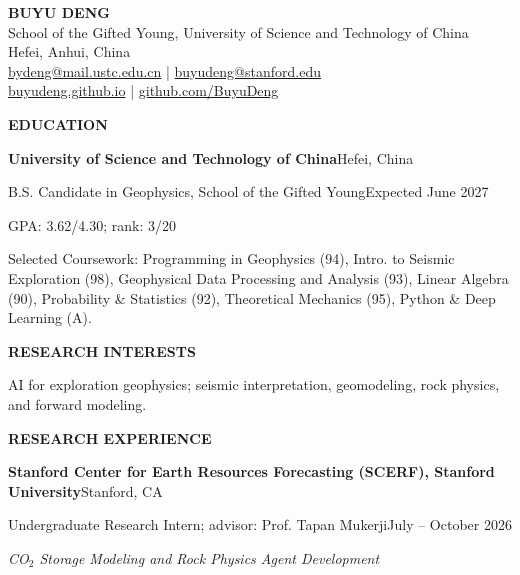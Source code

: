 \documentclass[10pt,letterpaper]{article}
\newcommand{\cvsection}[1]{\vspace{0.85em}\begin{center}\bfseries\MakeUppercase{#1}\end{center}\vspace{-0.7em}}
\newcommand{\cvorg}[2]{\textbf{#1}\hfill #2\par}
\newcommand{\cvrole}[2]{#1\hfill #2\par}
\newcommand{\cvproject}[1]{\par\vspace{0.42em}\textit{#1}\par}
\newcommand{\cvcontact}[3]{\href{#1}{#2\enspace #3}}
\begin{document}
\begin{center}
  {\large\bfseries BUYU DENG}\\[2pt]
  School of the Gifted Young, University of Science and Technology of China\\
  Hefei, Anhui, China\\
  \cvcontact{mailto:bydeng@mail.ustc.edu.cn}{\faEnvelope}{bydeng@mail.ustc.edu.cn}
  \quad | \quad
  \cvcontact{mailto:buyudeng@stanford.edu}{\faEnvelope}{buyudeng@stanford.edu}\\
  \cvcontact{https://buyudeng.github.io/}{\faGlobe}{buyudeng.github.io}
  \quad | \quad
  \cvcontact{https://github.com/BuyuDeng}{\faGithub}{github.com/BuyuDeng}
\end{center}
\cvsection{Education}
\cvorg{University of Science and Technology of China}{Hefei, China}
\cvrole{B.S. Candidate in Geophysics, School of the Gifted Young}{Expected June 2027}
GPA: 3.62/4.30; rank: 3/20\\
{\fontsize{9.3}{11.2}\selectfont
Selected Coursework: Programming in Geophysics (94), Intro. to Seismic Exploration (98), Geophysical Data Processing and Analysis (93), Linear Algebra (90), Probability \& Statistics (92), Theoretical Mechanics (95), Python \& Deep Learning (A).\par}
\cvsection{Research Interests}
AI for exploration geophysics; seismic interpretation, geomodeling, rock physics, and forward modeling.
\cvsection{Research Experience}\vspace{0.3em}
\cvorg{Stanford Center for Earth Resources Forecasting (SCERF), Stanford University}{Stanford, CA}
\cvrole{Undergraduate Research Intern; advisor: Prof. Tapan Mukerji}{July -- October 2026}
\cvproject{CO$_2$ Storage Modeling and Rock Physics Agent Development}
\end{document}
